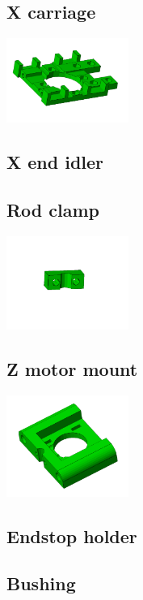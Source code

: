\documentclass[11pt]{article}
\begin{document}
\hypertarget{thing_x-carriage}{\subsection{X carriage}}
\includegraphics[width=4cm]{images/x-carriage.jpg}

\hypertarget{thing_x-end-idler}{\subsection{X end idler}}

\hypertarget{thing_rod-clamp}{\subsection{Rod clamp}}
\includegraphics[width=4cm]{images/rod-clamp.jpg}

\hypertarget{thing_z-motor-mount}{\subsection{Z motor mount}}
\includegraphics[width=4cm]{images/z-motor-mount.jpg}

\hypertarget{thing_endstop-holder}{\subsection{Endstop holder}}

\hypertarget{thing_bushing}{\subsection{Bushing}}
\end{document}
